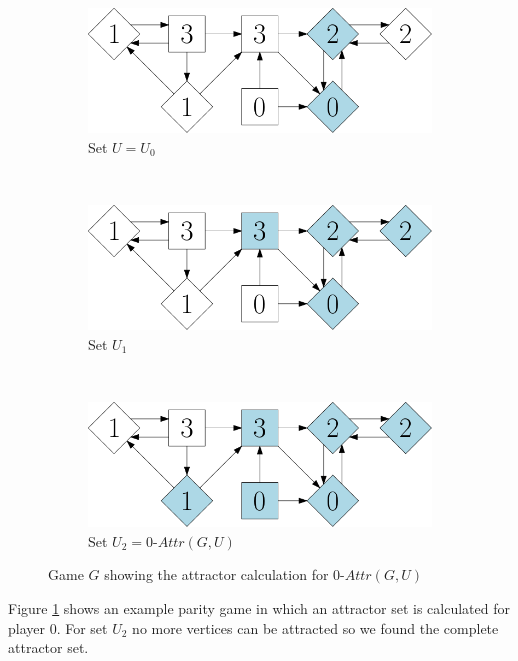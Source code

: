 \begin{figure}
	\centering
	\begin{subfigure}{1\textwidth}
		\centering
		\includegraphics[scale=0.4]{Examples/Attr/Attr0}
		\caption{Set $U = U_0$}
	\end{subfigure}\\
	\begin{subfigure}{1\textwidth}
		\centering
		\includegraphics[scale=0.4]{Examples/Attr/Attr1}
		\caption{Set $U_1$}
	\end{subfigure}\\
	\begin{subfigure}{1\textwidth}
		\centering
		\includegraphics[scale=0.4]{Examples/Attr/Attr2}
		\caption{Set $U_2 = 0\textit{-Attr}(G,U)$}
	\end{subfigure}
	\caption{Game $G$ showing the attractor calculation for $0\textit{-Attr}(G,U)$}
	\label{fig:AttrCalcExample}
\end{figure}
Figure \ref{fig:AttrCalcExample} shows an example parity game in which an attractor set is calculated for player $0$. For set $U_2$ no more vertices can be attracted so we found the complete attractor set.

